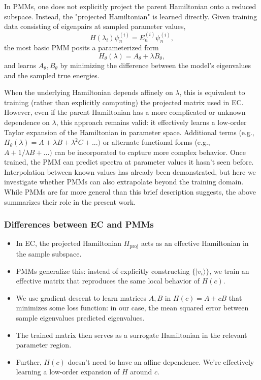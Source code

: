 In PMMs, one does not explicitly project the parent Hamiltonian onto a reduced subspace. Instead, the "projected Hamiltonian" is learned directly. Given training data consisting of eigenpairs at sampled parameter values,
$$
H(\lambda_i) \psi_n^{(i)} = E_n^{(i)} \psi_n^{(i)},
$$
the most basic PMM posits a parameterized form 
$$
H_\theta(\lambda) = A_\theta + \lambda B_\theta,
$$
and learns $A_\theta, B_\theta$ by minimizing the difference between the model’s eigenvalues and the sampled true energies. 

When the underlying Hamiltonian depends affinely on $\lambda$, this is equivalent to training (rather than explicitly computing) the projected matrix used in EC. However, even if the parent Hamiltonian has a more complicated or unknown dependence on $\lambda$, this approach remains valid: it effectively learns a low-order Taylor expansion of the Hamiltonian in parameter space. Additional terms (e.g., $H_\theta(\lambda) = A + \lambda B + \lambda^2 C + ...)$ or alternate functional forms (e.g., $A + 1/\lambda B + ...)$ can be incorporated to capture more complex behavior.
Once trained, the PMM can predict spectra at parameter values it hasn’t seen before. Interpolation between known values has already been demonstrated, but here we investigate whether PMMs can also extrapolate beyond the training domain. While PMMs are far more general than this brief description suggests, the above summarizes their role in the present work.

\subsubsection{Differences between EC and PMMs}

\begin{itemize}
	\item In EC, the projected Hamiltonian $H_{\text{proj}}$ acts as an effective Hamiltonian in the sample subspace.
	\item PMMs generalize this: instead of explicitly constructing $\{ |v_i\rangle \}$,
	we train an effective matrix that reproduces the same local behavior of $H(c)$.
	\item We use gradient descent to learn matrices $A, B$ in $H(c) = A + cB$ that minimizes some loss function: in our case, the mean squared error
	between sample eigenvalues predicted eigenvalues.
	\item The trained matrix then serves as a surrogate Hamiltonian in the relevant parameter region.
	\item Further, $H(c)$ doesn't need to have an affine dependence. We're effectively learning a low-order expansion of $H$ around $c$.
\end{itemize}

